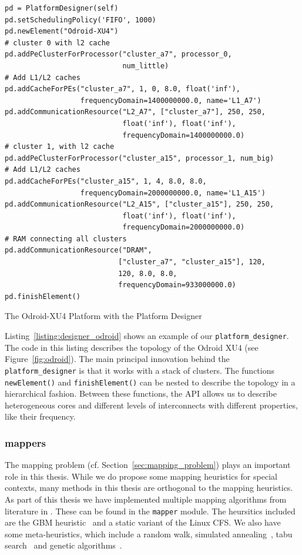 \begin{listing}
\begin{verbatim}
pd = PlatformDesigner(self)
pd.setSchedulingPolicy('FIFO', 1000)
pd.newElement("Odroid-XU4")
# cluster 0 with l2 cache
pd.addPeClusterForProcessor("cluster_a7", processor_0,
                            num_little)
# Add L1/L2 caches
pd.addCacheForPEs("cluster_a7", 1, 0, 8.0, float('inf'),
                  frequencyDomain=1400000000.0, name='L1_A7')
pd.addCommunicationResource("L2_A7", ["cluster_a7"], 250, 250,
                            float('inf'), float('inf'),
                            frequencyDomain=1400000000.0)
# cluster 1, with l2 cache
pd.addPeClusterForProcessor("cluster_a15", processor_1, num_big)
# Add L1/L2 caches
pd.addCacheForPEs("cluster_a15", 1, 4, 8.0, 8.0,
                  frequencyDomain=2000000000.0, name='L1_A15')
pd.addCommunicationResource("L2_A15", ["cluster_a15"], 250, 250,
                            float('inf'), float('inf'),
                            frequencyDomain=2000000000.0)
# RAM connecting all clusters
pd.addCommunicationResource("DRAM",
                           ["cluster_a7", "cluster_a15"], 120,
                           120, 8.0, 8.0,
                           frequencyDomain=933000000.0)
pd.finishElement()
\end{verbatim}
\caption{The Odroid-XU4 Platform with the Platform Designer}
\label{listing:designer_odroid}
\end{listing}

Listing~\ref{listing:designer_odroid} shows an example of our \texttt{platform\_designer}.
The code in this listing describes the topology of the Odroid XU4 (see Figure~\ref{fig:odroid}). 
The main principal innovation behind the \texttt{platform\_designer} is that it works with a stack of clusters.
The functions \texttt{newElement()} and \texttt{finishElement()} can be nested to describe the topology in a hierarchical fashion.
Between these functions, the \ac{API} allows us to describe heterogeneous cores and different levels of interconnects with different properties, like their frequency.

\subsubsection{mappers}

The mapping problem (cf. Section~\ref{sec:mapping_problem}) plays an important role in this thesis.
While we do propose some mapping heuristics for special contexts, many methods in this thesis are orthogonal to the mapping heuristics.
As part of this thesis we have implemented multiple mapping algorithms from literature in \mocasin.
These can be found in the \texttt{mapper} module. 
The heursitics included are the \ac{GBM} heuristic~\cite{castrillon_dac12} and a static variant of the Linux \ac{CFS}.
We also have some meta-heuristics, which include a random walk, simulated annealing~\cite{simulated_annealing}, tabu search~\cite{tabu_search} and genetic algorithms~\cite{erbas2006multiobjective}. 

